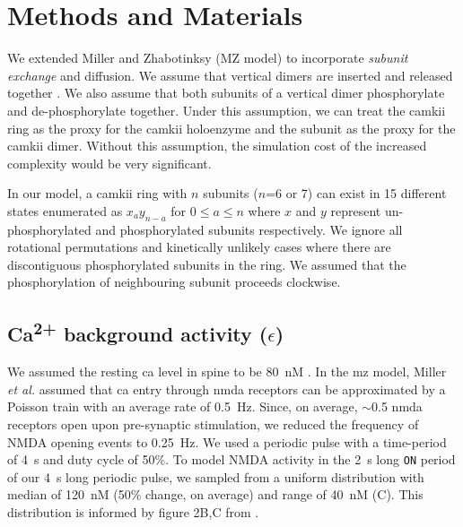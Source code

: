 \documentclass[9pt,lineno,doublespacing]{elife}
\newcommand\SUP[2]{#1\textsuperscript{#2}}
\begin{document}
\section{Methods and Materials}{\label{sec:materials_and_methods} 

We extended Miller and Zhabotinksy (MZ model) \citep{miller_stability_2005} to
incorporate \emph{subunit exchange} and diffusion. We assume that vertical
dimers are inserted and released together \citep{bhattacharyya_molecular_2016}.
We also assume that both subunits of a vertical dimer phosphorylate and
de-phosphorylate together. Under this assumption, we can treat the \gls{camkii}
ring as the proxy for the \gls{camkii} holoenzyme and the subunit as the proxy
for the \gls{camkii} dimer. Without this assumption, the simulation cost of the
increased complexity would be very significant. 

In our model, a \gls{camkii} ring with $n$ subunits ($n$=6 or 7) can exist
in 15 different states enumerated as $x_{a}y_{n-a}$ for $0 \le a \le n$ where
$x$ and $y$ represent un-phosphorylated and phosphorylated subunits
respectively. We ignore all rotational permutations and kinetically unlikely
cases where there are discontiguous phosphorylated subunits in the ring. We
assumed that the phosphorylation of neighbouring subunit proceeds clockwise.

\subsection{\SUP{Ca}{2+} background activity ($\epsilon$)}\label{subsec:calcium_background}

We assumed the resting \gls{ca} level in spine to be \SI{80}{\nano M}
\citep{berridge_neuronal_1998}. In the \gls{mz} model, Miller \textit{et al.}
assumed that \gls{ca} entry through \gls{nmda} receptors can be approximated by
a Poisson train with an average rate of \SI{0.5}{Hz}. Since, on average,
$\sim$0.5 \gls{nmda} receptors open \citep{nimchinsky_number_2004} upon
pre-synaptic stimulation, we reduced the frequency of NMDA opening events to
\SI{0.25}{Hz}. We used a periodic pulse with a time-period of \SI{4}{\second}
and duty cycle of 50\%.  To model NMDA activity in the \SI{2}{\second} long
\texttt{ON} period of our \SI{4}{\second} long periodic pulse, we sampled from a
uniform distribution with median of \SI{120}{\nano M} (50\% change, on average)
and range of \SI{40}{\nano M} (C). This distribution is informed
by figure 2B,C from \cite{nimchinsky_number_2004}.

}
\end{document}
